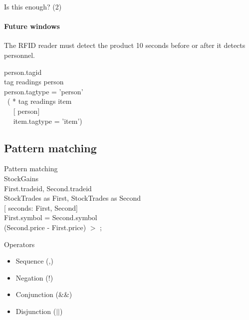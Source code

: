 \documentclass[brown, compress, mathserif]{beamer}
\begin{document}
\begin{frame}{Is this enough? (2)}
  \framesubtitle{Future windows}
  \begin{center}
    \begin{example}
      The RFID reader must detect the product 10 seconds before or after it detects personnel.
    \end{example}
  \end{center}

  \begin{small}
     person.tagid\\
     tag readings  person\\
     person.tagtype = ’person’ \\
    \ ( *  tag readings  item\\
    \ \  [  person]\\
    \ \  item.tagtype = ’item’)
  \end{small}
\end{frame}

\subsection{Pattern matching}


\begin{frame}{Pattern matching}
  \hlstd{}\hspace*{\fill}\\
   StockGains\\
   First.tradeid, Second.tradeid\\
    StockTrades as First, StockTrades as Second\\
  [ seconds: First, Second]\\
   First.symbol = Second.symbol\\
  (Second.price - First.price) $>$ ;
\end{frame}


\begin{frame}{Operators}
  \begin{itemize}
  \item Sequence (,)
  \item Negation (!)
  \item Conjunction (\&\&)
  \item Disjunction ($||$)
  \end{itemize}
\end{frame}
\end{document}
